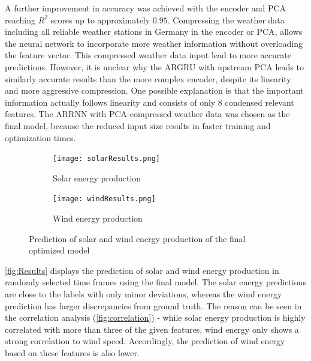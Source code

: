 \documentclass[11pt,table]{article}
\begin{document}
A further improvement in accuracy was achieved with the encoder and \ac{PCA} reaching $R^2$ scores up to approximately $0.95$. Compressing the weather data including all reliable weather stations in Germany in the encoder or \ac{PCA}, allows the neural network to incorporate more weather information without overloading the feature vector. This compressed weather data input lead to more accurate predictions. However, it is unclear why the ARGRU with upstream \ac{PCA} leads to similarly accurate results than the more complex encoder, despite its linearity and more aggressive compression. One possible explanation is that the important information actually follows linearity and consists of only 8 condensed relevant features. The \ac{ARRNN} with \ac{PCA}-compressed weather data was chosen as the final model, because the reduced input size results in faster training and optimization times.

\begin{figure}[p]
\centering
\begin{subfigure}{\textwidth}
  \centering
  \texttt{[image: solarResults.png]}
  \label{fig:ResultsWind}
  \caption{Solar energy production}
\end{subfigure}
\begin{subfigure}{\textwidth}
  \centering
  \texttt{[image: windResults.png]}
  \label{fig:ResultsSolar}
  \caption{Wind energy production}
\end{subfigure}
\caption{Prediction of solar and wind energy production of the final optimized model}
\label{fig:Results}
\end{figure}

\autoref{fig:Results} displays the prediction of solar and wind energy production in randomly selected time frames using the final model. The solar energy predictions are close to the labels with only minor deviations, whereas the wind energy prediction has larger discrepancies from ground truth. The reason can be seen in the correlation analysis (\autoref{fig:correlation}) - while solar energy production is highly correlated with more than three of the given features, wind energy only shows a strong correlation to wind speed. Accordingly, the prediction of wind energy based on these features is also lower.
\newpage
\end{document}
